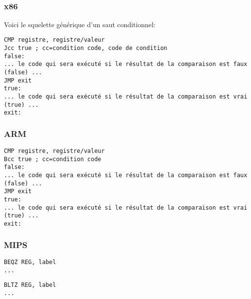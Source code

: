 \label{sec:Jcc}






\subsection{\Conclusion{}}

\subsubsection{x86}

Voici le squelette générique d'un saut conditionnel:

\begin{lstlisting}[caption=x86,style=customasmx86]
CMP registre, registre/valeur
Jcc true ; cc=condition code, code de condition
false:
... le code qui sera exécuté si le résultat de la comparaison est faux (false) ...
JMP exit 
true:
... le code qui sera exécuté si le résultat de la comparaison est vrai (true) ...
exit:
\end{lstlisting}

\subsubsection{ARM}

\begin{lstlisting}[caption=ARM,style=customasmARM]
CMP registre, registre/valeur
Bcc true ; cc=condition code
false:
... le code qui sera exécuté si le résultat de la comparaison est faux (false) ...
JMP exit 
true:
... le code qui sera exécuté si le résultat de la comparaison est vrai (true) ...
exit:
\end{lstlisting}

\subsubsection{MIPS}

\begin{lstlisting}[caption=Teste si égal à zéro (Branch if EQual Zero),style=customasmMIPS]
BEQZ REG, label
...
\end{lstlisting}

\begin{lstlisting}[caption=Teste si plus petit que zéro (Branch if Less Than Zero) en utilisant une pseudo instruction,style=customasmMIPS]
BLTZ REG, label
...
\end{lstlisting}


